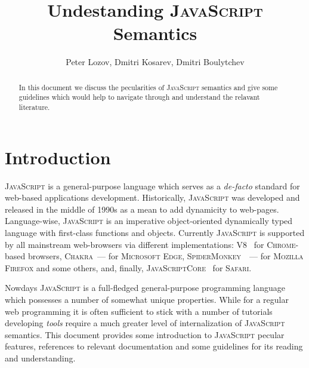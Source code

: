 \documentclass{article}
\date{}
\newcommand{\js}{\textsc{JavaScript}\xspace}
\begin{document}
\title{Undestanding \js Semantics}

\author{Peter Lozov, Dmitri Kosarev, Dmitri Boulytchev}

\maketitle

\begin{abstract}
  In this document we discuss the pecularities of \js semantics and give some
  guidelines which would help to navigate through and understand the relavant
  literature.
\end{abstract}

\section{Introduction}

\js is a general-purpose language which serves as a \emph{de-facto} standard for web-based
applications development. Historically, \js was developed and released in the middle of 1990s
as a mean to add dynamicity to web-pages. Language-wise, \js is an imperative object-oriented
dynamically typed language with first-class functions and objects. Currently \js is
supported by all mainstream web-browsers via different implementations: \textsc{V8}~\cite{V8}
for \textsc{Chrome}-based browsers, \textsc{Chakra}~--- for \textsc{Microsoft Edge},
\textsc{SpiderMonkey}~\cite{SpiderMonkey}~--- for \textsc{Mozilla Firefox} and some others, and,
finally, \textsc{JavaScriptCore}~\cite{JavaScriptCore} for \textsc{Safari}.

Nowdays \js is a full-fledged general-purpose programming language which possesses a number of
somewhat unique properties. While for a regular web programming it is often sufficient to
stick with a number of tutorials~\cite{Tutorial} developing \emph{tools} require a
much greater level of internalization of \js semantics. This document provides some
introduction to \js pecular features, references to relevant documentation and
some guidelines for its reading and understanding.
\end{document}
